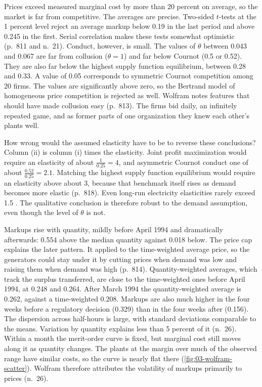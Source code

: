 Prices exceed measured marginal cost by more than 20 percent on average, so the market is far from competitive. The
averages are precise. Two-sided $t$-tests at the 1 percent level reject an average markup below 0.19 in the last period
and above 0.245 in the first. Serial correlation makes these tests somewhat optimistic (p.~811 and n.~21).
Conduct, however, is small. The values of $\theta$ between 0.043 and 0.067 are far from collusion ($\theta = 1$) and far
below Cournot (0.5 or 0.52). They are also far below the highest supply function equilibrium, between 0.28 and 0.33. A
value of 0.05 corresponds to symmetric Cournot competition among 20 firms. The values are significantly above zero, so
the Bertrand model of homogeneous price competition is rejected as well. Wolfram notes features that should have made
collusion easy (p.~813). The firms bid daily, an infinitely repeated game, and as former parts of one organization they
knew each other's plants well.

How wrong would the assumed elasticity have to be to reverse these conclusions? Column (ii) is column (i) times the
elasticity. Joint profit maximization would require an elasticity of about $\frac{1}{0.25} = 4$, and asymmetric Cournot
conduct one of about $\frac{0.52}{0.25} = 2.1$. Matching the highest supply function equilibrium would require an
elasticity above about 3, because that benchmark itself rises as demand becomes more elastic (p.~818). Even long-run electricity elasticities rarely exceed 1.5 \citep{Taylor1975}. The
qualitative conclusion
is therefore robust to the demand assumption, even though the level of $\theta$ is not.

Markups rise with quantity, mildly before April 1994 and dramatically afterwards: 0.554 above the median quantity
against 0.018 below. The price cap explains the later pattern. It applied to the time-weighted average price, so the
generators could stay under it by cutting prices when demand was low and raising them when demand was high (p.~814).
Quantity-weighted averages, which track the surplus transferred, are close to the time-weighted ones before April 1994,
at 0.248 and 0.264. After March 1994 the quantity-weighted average is 0.262, against a time-weighted 0.208. Markups are
also much higher in the four weeks before a regulatory decision (0.329) than in the four weeks after (0.156). The
dispersion across half-hours is large, with standard deviations comparable to the means. Variation by quantity explains
less than 5 percent of it (n.~26). Within a month the merit-order curve is fixed, but marginal cost still moves along
it as quantity changes. The plants at the margin over much of the observed range have similar costs, so the curve is
nearly flat there (\cref{fig:03-wolfram-scatter}). Wolfram therefore attributes the volatility of markups primarily to
prices (n.~26).

